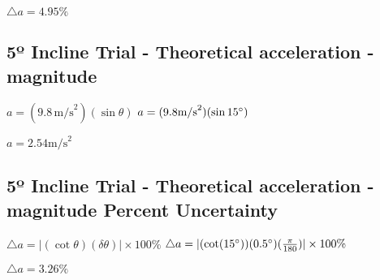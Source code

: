 \documentclass{article}
\begin{document}
$\triangle a = {4.95} \%$

\subsection{5º Incline Trial - Theoretical acceleration - magnitude}
$a = (9.8 \, \text {m/s}^2) (\sin\theta)$
\newline 
$a = (9.8 \text {m/s}^2)(\sin {15}{\degree})$
\newline 





$a = 2.54 \text {m/s}^2$
\[
\]
\subsection{5º Incline Trial - Theoretical acceleration - magnitude Percent Uncertainty}
$\triangle a = |(\cot \theta)(\delta \theta)| \times 100 \%$
\newline
$\triangle a = |(\cot ({15\degree}))({0.5\degree})(\frac {\pi}{180})| \times 100 \%$
\newline 




$\triangle a = {3.26} \%$
\end{document}
